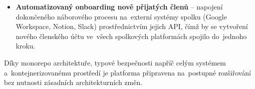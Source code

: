 \begin{sloppypar}
\begin{itemize}
    \item \textbf{Automatizovaný onboarding nově přijatých členů} -- napojení dokončeného náborového procesu na~externí systémy spolku (Google Workspace, Notion, Slack) prostřednictvím jejich API, čímž by se vytvoření nového členského účtu ve~všech spolkových platformách spojilo do~jednoho kroku.
\end{itemize}
\end{sloppypar}

Díky monorepo architektuře, typové bezpečnosti napříč celým systémem a~kontejnerizovanému prostředí je platforma připravena na~postupné rozšiřování bez nutnosti zásadních architekturních změn.
